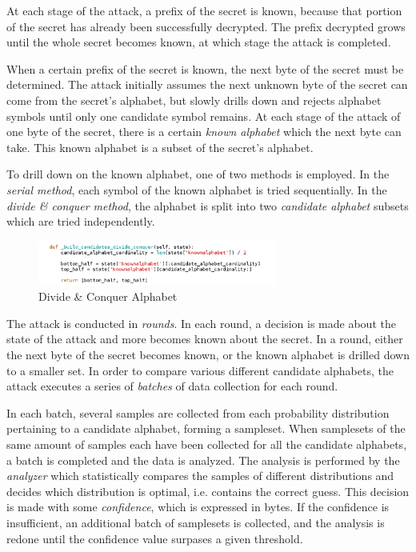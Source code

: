 At each stage of the attack, a prefix of the secret is known, because that
portion of the secret has already been successfully decrypted. The prefix
decrypted grows until the whole secret becomes known, at which stage the attack
is completed.

When a certain prefix of the secret is known, the next byte of the secret must
be determined. The attack initially assumes the next unknown byte of the secret
can come from the secret's alphabet, but slowly drills down and rejects
alphabet symbols until only one candidate symbol remains. At each stage of the
attack of one byte of the secret, there is a certain \textit{known alphabet} which
the next byte can take. This known alphabet is a subset of the secret's
alphabet.

To drill down on the known alphabet, one of two methods is employed. In the
\textit{serial method}, each symbol of the known alphabet is tried sequentially. In
the \textit{divide \& conquer method}, the alphabet is split into two \textit{candidate
alphabet} subsets which are tried independently.


\begin{figure}[H] \caption{Divide \& Conquer Alphabet} \centering
\includegraphics[width=0.7\textwidth]{diagrams/divideconquer.png}\end{figure}

The attack is conducted in \textit{rounds}. In each round, a decision is made
about the state of the attack and more becomes known about the secret. In a
round, either the next byte of the secret becomes known, or the known alphabet
is drilled down to a smaller set. In order to compare various different
candidate alphabets, the attack executes a series of \textit{batches} of data
collection for each round.

In each batch, several samples are collected from each probability distribution
pertaining to a candidate alphabet, forming a sampleset. When samplesets of the
same amount of samples each have been collected for all the candidate
alphabets, a batch is completed and the data is analyzed. The analysis is
performed by the \textit{analyzer} which statistically compares the samples of
different distributions and decides which distribution is optimal, i.e.
contains the correct guess. This decision is made with some \textit{confidence},
which is expressed in bytes. If the confidence is insufficient, an additional
batch of samplesets is collected, and the analysis is redone until the
confidence value surpases a given threshold.


